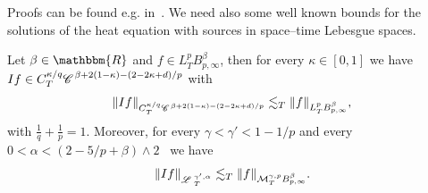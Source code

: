 \begin{appendices}
Proofs can be found e.g. in~{\cite{gubinelli_kpz_2017}}. We need also some
well known bounds for the solutions of the heat equation with sources in
space--time Lebesgue spaces.

\begin{lemma}
  \label{l:lp-integ}Let $\beta \in \mathbbm{R}$ and $f \in L^p_T B^{\beta}_{p,
  \infty}$, then for every $\kappa \in [0, 1]$ we have $I f \in C_T^{\kappa /
  q} \mathcal{\mathscr{C} \hspace{.1em}}^{\beta + 2 (1 - \kappa) - (2 - 2 \kappa + d) / p}$ with
  \[ \|I f\|_{C_T^{\kappa / q}  \mathcal{\mathscr{C} \hspace{.1em}}^{\beta + 2 (1 - \kappa) - (2 - 2
     \kappa + d) / p}} \lesssim_T \|f\|_{L^p_T B^{\beta}_{p, \infty}}, \]
  with $\frac{1}{q} + \frac{1}{p} = 1$. Moreover, for every $\gamma < \gamma'
  < 1 - 1 / p$ and every $0 < \alpha < (2 - 5 / p + \beta) \wedge 2$ \ we have
  \[ \| I f \|_{\mathscr{L} \hspace{.2em}^{\gamma', \alpha}_T} \lesssim_T \| f
     \|_{\mathcal{M}^{\gamma, p}_T B^{\beta}_{p, \infty}} . \]
\end{lemma}


\end{appendices}

